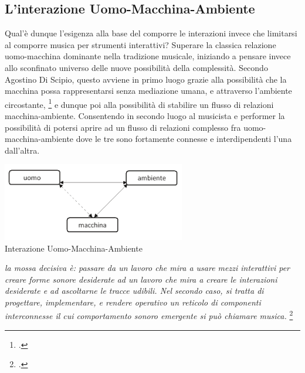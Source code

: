 \subsection{L'interazione Uomo-Macchina-Ambiente}
\label{sec:L'interazione Uomo-Macchina-Ambiente}

Qual'è dunque l'esigenza alla base del comporre le interazioni invece 
che limitarsi al comporre musica per strumenti interattivi? 
Superare la classica relazione uomo-macchina dominante nella tradizione musicale, 
iniziando a pensare invece allo sconfinato universo delle nuove possibilità della complessità.
Secondo Agostino Di Scipio, questo avviene in primo luogo grazie 
alla possibilità che la macchina possa rappresentarsi
senza mediazione umana, e attraverso l'ambiente circostante, \footcite{discipio_polverisonore_2016}
e dunque poi alla possibilità di stabilire un flusso di relazioni macchina-ambiente. 
Consentendo in secondo luogo al musicista e performer 
la possibilità di potersi aprire ad un flusso di relazioni 
complesso fra uomo-macchina-ambiente dove le tre sono fortamente connesse e interdipendenti 
l'una dall'altra.

\begin{center}
\vspace{0.5cm}
\includegraphics[width=8cm]{figures/uomo_macchina_ambiente.png} \\
{Interazione Uomo-Macchina-Ambiente} \\ 
\vspace{0.5cm}
\end{center}

\begin{center}
\vspace{0.5cm}
\textit{la mossa decisiva è: passare da un lavoro che mira a usare mezzi interattivi per creare forme sonore desiderate ad
un lavoro che mira a creare le interazioni desiderate e ad ascoltarne le tracce udibili. Nel secondo caso, si tratta
di progettare, implementare, e rendere operativo un reticolo di componenti interconnesse il cui comportamento
sonoro emergente si può chiamare musica.} \footcite{discipio_polverisonore_2016}
\vspace{0.5cm}
\end{center}

